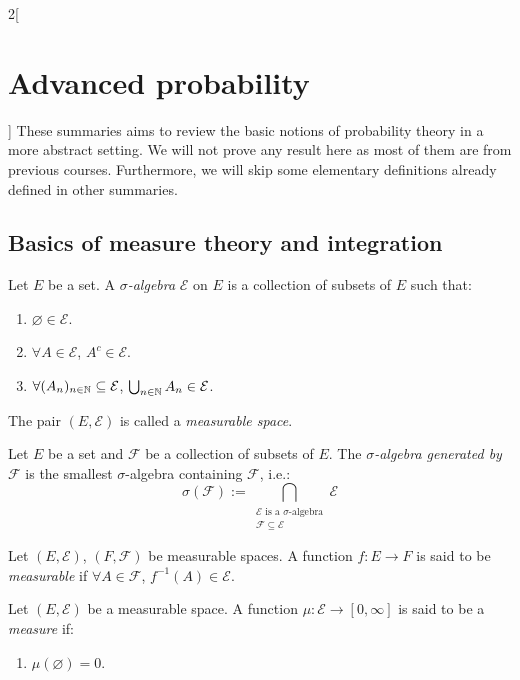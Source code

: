 \documentclass[../../../main_math.tex]{subfiles}
\begin{document}
\begin{multicols}{2}[\section{Advanced probability}]
  These summaries aims to review the basic notions of probability theory in a more abstract setting. We will not prove any result here as most of them are from previous courses. Furthermore, we will skip some elementary definitions already defined in other summaries.
  \subsection{Basics of measure theory and integration}
  \begin{definition}
    Let $E$ be a set. A \emph{$\sigma$-algebra} $\mathcal{E}$ on $E$ is a collection of subsets of $E$ such that:
    \begin{enumerate}
      \item $\varnothing\in\mathcal{E}$.
      \item $\forall A\in\mathcal{E}$, $A^c\in\mathcal{E}$.
      \item $\forall (A_n)_{n\in\mathbb{N}}\subseteq \mathcal{E}$, $\bigcup_{n\in\mathbb{N}}{A_n}\in\mathcal{E}$.
    \end{enumerate}
    The pair $(E,\mathcal{E})$ is called a \emph{measurable space}.
  \end{definition}
  \begin{definition}
    Let $E$ be a set and $\mathcal{F}$ be a collection of subsets of $E$. The \emph{$\sigma$-algebra generated by $\mathcal{F}$} is the smallest $\sigma$-algebra containing $\mathcal{F}$, i.e.:
    $$
      \sigma(\mathcal{F}):=\bigcap_{\substack{\mathcal{E}\text{ is a }\sigma\text{-algebra}\\\mathcal{F}\subseteq \mathcal{E}}}{\mathcal{E}}
    $$
  \end{definition}
  \begin{definition}
    Let $(E,\mathcal{E})$, $(F,\mathcal{F})$ be measurable spaces. A function $f:E\to F$ is said to be \emph{measurable} if $\forall A\in\mathcal{F}$, $f^{-1}(A)\in\mathcal{E}$.
  \end{definition}
  \begin{definition}[Measure]
    Let $(E,\mathcal{E})$ be a measurable space. A function $\mu:\mathcal{E}\to [0,\infty]$ is said to be a \emph{measure} if:
    \begin{enumerate}
      \item $\mu(\varnothing)=0$.

\end{enumerate}
\end{definition}
\end{multicols}
\end{document}
